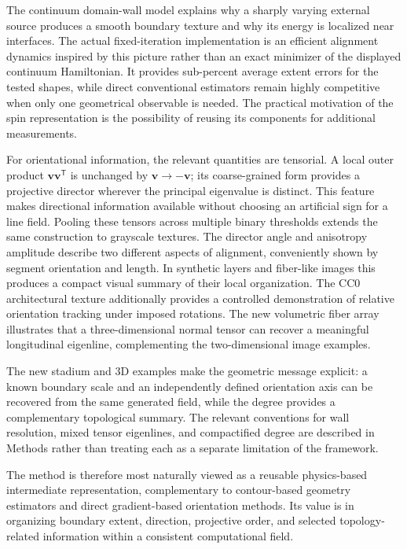 \documentclass[11pt,a4paper]{article}
\newcommand{\vv}{\bm v}
\begin{document}
The continuum domain-wall model explains why a sharply varying external source produces a smooth boundary texture and why its energy is localized near interfaces. The actual fixed-iteration implementation is an efficient alignment dynamics inspired by this picture rather than an exact minimizer of the displayed continuum Hamiltonian. It provides sub-percent average extent errors for the tested shapes, while direct conventional estimators remain highly competitive when only one geometrical observable is needed. The practical motivation of the spin representation is the possibility of reusing its components for additional measurements.

For orientational information, the relevant quantities are tensorial. A local outer product $\vv\vv^{\mathsf T}$ is unchanged by $\vv\rightarrow-\vv$; its coarse-grained form provides a projective director wherever the principal eigenvalue is distinct. This feature makes directional information available without choosing an artificial sign for a line field. Pooling these tensors across multiple binary thresholds extends the same construction to grayscale textures. The director angle and anisotropy amplitude describe two different aspects of alignment, conveniently shown by segment orientation and length. In synthetic layers and fiber-like images this produces a compact visual summary of their local organization. The CC0 architectural texture additionally provides a controlled demonstration of relative orientation tracking under imposed rotations. The new volumetric fiber array illustrates that a three-dimensional normal tensor can recover a meaningful longitudinal eigenline, complementing the two-dimensional image examples.

The new stadium and 3D examples make the geometric message explicit: a known boundary scale and an independently defined orientation axis can be recovered from the same generated field, while the degree provides a complementary topological summary. The relevant conventions for wall resolution, mixed tensor eigenlines, and compactified degree are described in Methods rather than treating each as a separate limitation of the framework.

The method is therefore most naturally viewed as a reusable physics-based intermediate representation, complementary to contour-based geometry estimators and direct gradient-based orientation methods. Its value is in organizing boundary extent, direction, projective order, and selected topology-related information within a consistent computational field.
\end{document}
